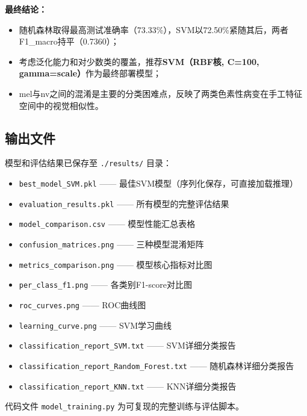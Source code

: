 \documentclass[12pt,a4paper]{ctexart}
\begin{document}
\textbf{最终结论：}
\begin{itemize}
    \item 随机森林取得最高测试准确率（73.33\%），SVM以72.50\%紧随其后，两者F1\_macro持平（0.7360）；
    \item 考虑泛化能力和对少数类的覆盖，推荐\textbf{SVM（RBF核, C=100, gamma=scale）}作为最终部署模型；
    \item mel与nv之间的混淆是主要的分类困难点，反映了两类色素性病变在手工特征空间中的视觉相似性。
\end{itemize}

\subsection{输出文件}

模型和评估结果已保存至 \texttt{./results/} 目录：

\begin{itemize}
    \item \texttt{best\_model\_SVM.pkl} —— 最佳SVM模型（序列化保存，可直接加载推理）
    \item \texttt{evaluation\_results.pkl} —— 所有模型的完整评估结果
    \item \texttt{model\_comparison.csv} —— 模型性能汇总表格
    \item \texttt{confusion\_matrices.png} —— 三种模型混淆矩阵
    \item \texttt{metrics\_comparison.png} —— 模型核心指标对比图
    \item \texttt{per\_class\_f1.png} —— 各类别F1-score对比图
    \item \texttt{roc\_curves.png} —— ROC曲线图
    \item \texttt{learning\_curve.png} —— SVM学习曲线
    \item \texttt{classification\_report\_SVM.txt} —— SVM详细分类报告
    \item \texttt{classification\_report\_Random\_Forest.txt} —— 随机森林详细分类报告
    \item \texttt{classification\_report\_KNN.txt} —— KNN详细分类报告
\end{itemize}

代码文件 \texttt{model\_training.py} 为可复现的完整训练与评估脚本。
\end{document}
